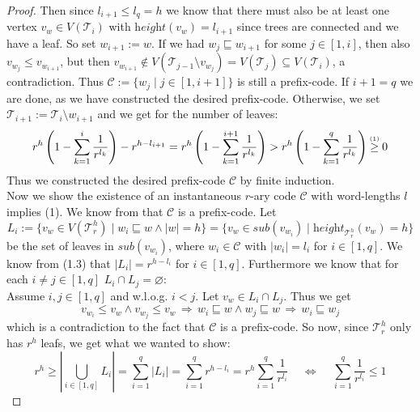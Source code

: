 \documentclass[12pt]{article}
\newcommand{\up}[2]{\mathrel{\overset{\makebox[0pt]{\mbox{\normalfont\tiny #2}}}{#1}}}
\newcommand{\T}[0]{{\mathcal{T}_r^h}}
\newcommand{\he}[0]{\textit{height}}
\newcommand{\SUB}[0]{\textit{sub}}
\newenvironment{statement3}[3]{\begin{trivlist}
\item[\hskip \labelsep {\bfseries #1}\hskip \labelsep {\bfseries #2} {#3}\textbf{.}]}{\end{trivlist}}
\begin{document}
\begin{statement3}{(1.6)}{Theorem}{(Kraft's Inequality)}
\begin{proof}
        Then since $l_{i+1} \leq l_q = h$ we know that there must also be at least one vertex
        $v_w \in V(\mathcal{T}_i)$ with $\he(v_w) = l_{i+1}$ since trees are connected and we have a leaf.
        So set $w_{i+1} := w$. If we had $w_j \sqsubseteq w_{i+1}$ for
        some $j \in [1,i]$, then also $v_{w_j} \leq v_{w_{i+1}}$, but then
        $v_{w_{i+1}} \notin V(\mathcal{T}_{j-1} \setminus v_{w_j}) = V(\mathcal{T}_{j}) \subseteq V(\mathcal{T}_{i})$, a contradiction.
        Thus $\mathcal{C} := \{w_j \mid j \in [1, i+1]\}$ is still a prefix-code.
        If $i+1 = q$ we are done, as we have constructed the desired prefix-code. Otherwise,
        we set $\mathcal{T}_{i+1} := \mathcal{T}_i \setminus w_{i+1}$ and we get for the number of leaves:
        $$
            r^h\left(1-\sum_{k=1}^{i} \frac{1}{r^{l_k}}\right) - r^{h - l_{i+1}}
            = r^h\left(1-\sum_{k=1}^{i+1} \frac{1}{r^{l_k}}\right)
            > r^h\left(1-\sum_{k=1}^{q} \frac{1}{r^{l_k}}\right)
            \up{\geq}{(1)} 0
        $$
        Thus we constructed the desired prefix-code $\mathcal{C}$ by finite induction.\\[10pt]
        Now we show the existence of an instantaneous $r$-ary code $\mathcal{C}$ with word-lengths $l$ implies (1).
        We know from \cite{ICT} that $\mathcal{C}$ is a prefix-code. Let
        $$
            L_i := \{v_w \in V(\T) \mid w_i \sqsubseteq w \land |w| = h\}
            = \{v_w \in \SUB(v_{w_i}) \mid \he_\T(v_w) = h\}
        $$
        be the set of leaves in $\SUB(v_{w_i})$, where $w_i \in \mathcal{C}$ with $|w_i| = l_i$ for $i \in [1,q]$. We know from (1.3) that $|L_i| = r^{h - l_i}$
        for $i \in [1,q]$.
        Furthermore we know that for each $i\neq j \in [1,q]$ $L_i \cap L_j = \varnothing$:\\
        Assume $i,j \in [1,q]$ and w.l.o.g. $i < j$. Let $v_w \in L_i \cap L_j$. Thus we get
        $$
            v_{w_i} \leq v_w \land v_{w_j} \leq v_w \,\Longrightarrow\, w_i \sqsubseteq w \land w_j \sqsubseteq w
            \,\Longrightarrow\, w_i \sqsubseteq w_j
        $$
        which is a contradiction to the fact that $\mathcal{C}$ is a prefix-code.
        So now, since $\T$ only has $r^h$ leafs, we get what we wanted to show:
        $$
            r^h \geq |\bigcup_{i \in [1,q]} L_i| = \sum_{i = 1}^{q} |L_i| = \sum_{i=1}^{q} r^{h-l_i}
            = r^h\sum_{i=1}^{q} \frac{1}{r^{l_i}}
            \quad\,\Longleftrightarrow\,\quad \sum_{i=1}^{q} \frac{1}{r^{l_i}} \leq 1
        $$
    \end{proof}
\end{statement3}
\end{document}
